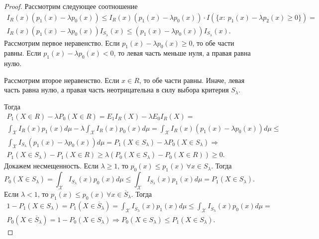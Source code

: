 \begin{proof}
    Рассмотрим следующее соотношение
    \begin{gather*}
        I_{R}( x)( p_{1}( x) -\lambda p_{0}( x)) \leqslant I_{R}( x)( p_{1}( x) -\lambda p_{0}( x)) \cdotp I(\{x:\ p_{1}( x) -\lambda p_{2}( x) \geqslant 0\}) =\\
        I_{R}( x)( p_{1}( x) -\lambda p_{0}( x)) I_{S_{\lambda }}( x) \leqslant ( p_{1}( x) -\lambda p_{0}( x)) I_{S_{\lambda }}( x) .
    \end{gather*}
    Рассмотрим первое неравенство. Если $\displaystyle p_{1}( x) -\lambda p_{0}( x) \geqslant 0$, то обе части равны. Если $\displaystyle p_{1}( x) -\lambda p_{0}( x) < 0$, то левая часть меньше нуля, а правая равна нулю.
    
    Рассмотрим второе неравенство. Если $\displaystyle x\in R$, то обе части равны. Иначе, левая часть равна нулю, а правая часть неотрицательна в силу выбора критерия $\displaystyle S_{\lambda }$.
    
    Тогда
    \begin{gather*}
        P_{1}( X\in R) -\lambda P_{0}( X\in R) =E_{1} I_{R}( X) -\lambda E_{0} I_{R}( X) =\\
        \int _{\mathcal{X}} I_{R}( x) p_{1}( x) d\mu -\lambda \int _{\mathcal{X}} I_{R}( x) p_{0}( x) d\mu =\int _{\mathcal{X}} I_{R}( x)( p_{1}( x) -\lambda p_{0}( x)) d\mu \leqslant \\
        \int _{\mathcal{X}} I_{S_{\lambda }}( p_{1}( x) -\lambda p_{0}( x)) d\mu =P_{1}( X\in S_{\lambda }) -\lambda P_{0}( X\in S_{\lambda }) \Rightarrow \\
        P_{1}( X\in S_{\lambda }) -P_{1}( X\in R) \geqslant \lambda ( P_{0}( X\in S_{\lambda }) -P_{0}( X\in R)) \geqslant 0.
    \end{gather*}
    Докажем несмещенность. Если $\displaystyle \lambda \geqslant 1$, то $\displaystyle p_{0}( x) \leqslant p_{1}( x) \ \forall x\in S_{\lambda }$. Тогда
    \begin{equation*}
        P_{0}( X\in S_{\lambda }) =\int _{\mathcal{X}} I_{S_{\lambda }}( x) p_{0}( x) d\mu \leqslant \int _{\mathcal{X}} I_{S_{\lambda }}( x) p_{1}( x)d\mu =P_{1}( X\in S_{\lambda }) .
    \end{equation*}
    Если $\displaystyle \lambda < 1$, то $\displaystyle p_{1}( x) \leqslant p_{0}( x) \ \forall x\in \overline{S}_{\lambda }$. Тогда
    \begin{gather*}
        1-P_{1}( X\in S_{\lambda }) =P_{1}( X\in \overline{S}_{\lambda }) =\int _{\mathcal{X}} I_{\overline{S}_{\lambda }}( x) p_{1}( x) d\mu \leqslant \int _{\mathcal{X}} I_{\overline{S}_{\lambda }}( x) p_{0}( x) d\mu =\\
        P_{0}( X\in \overline{S}_{\lambda }) =1-P_{0}( X\in S_{\lambda }) \Rightarrow P_{0}( X\in S_{\lambda }) \leqslant P_{1}( X\in S_{\lambda }) .
    \end{gather*}
\end{proof}
